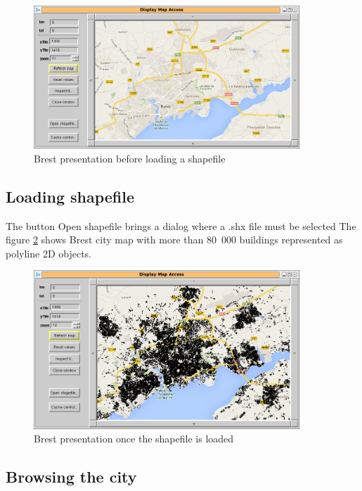 \begin{figure}
\begin{center}
\includegraphics[width=10cm]{mapAccessWindow.png}
\caption{Brest presentation before loading a shapefile}
\label{fig:mapAccessMainWindow}
\end{center}
\end{figure}

\subsection{Loading shapefile}

The button Open shapefile brings a dialog where a .shx file must be selected 
The figure \ref{fig:mapAccessFilled} shows Brest city map with 
more than 80~000 buildings represented as polyline 2D objects. 

\begin{figure}
\begin{center}
\includegraphics[width=10cm]{mapAccessFilled.png}
\caption{Brest presentation once the shapefile is loaded}
\label{fig:mapAccessFilled}
\end{center}
\end{figure}

\subsection{Browsing the city}


